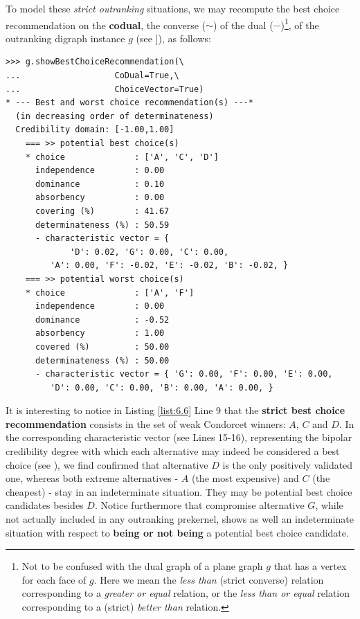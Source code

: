 To model these \emph{strict outranking} situations, we may recompute the best choice recommendation on the \textbf{codual}, the converse ($\sim$) of the dual ($-$)\footnote{Not to be confused with the dual graph of a plane graph $g$ that has a vertex for each face of $g$. Here we mean the \emph{less than} (strict converse) relation corresponding to a \emph{greater or equal} relation, or the \emph{less than or equal} relation corresponding to a (strict) \emph{better than} relation.}, of the outranking digraph instance $g$ (see \citep{BIS-2013}]), as follows:

\begin{lstlisting}[caption={Computing the strict best choice recommendation},label=list:6.6]
>>> g.showBestChoiceRecommendation(\
...                   CoDual=True,\
...                   ChoiceVector=True)   
* --- Best and worst choice recommendation(s) ---*
  (in decreasing order of determinateness)   
  Credibility domain: [-1.00,1.00]
    === >> potential best choice(s)
    * choice              : ['A', 'C', 'D']
      independence        : 0.00
      dominance           : 0.10
      absorbency          : 0.00
      covering (%)        : 41.67
      determinateness (%) : 50.59
      - characteristic vector = {
             'D': 0.02, 'G': 0.00, 'C': 0.00,
	     'A': 0.00, 'F': -0.02, 'E': -0.02, 'B': -0.02, }
    === >> potential worst choice(s) 
    * choice              : ['A', 'F']
      independence        : 0.00
      dominance           : -0.52
      absorbency          : 1.00
      covered (%)         : 50.00
      determinateness (%) : 50.00
      - characteristic vector = { 'G': 0.00, 'F': 0.00, 'E': 0.00,
	     'D': 0.00, 'C': 0.00, 'B': 0.00, 'A': 0.00, }
\end{lstlisting}				  

It is interesting to notice in Listing \ref{list:6.6} Line 9 that the \textbf{strict best choice recommendation} consists in the set of weak Condorcet winners: $A$, $C$ and $D$. In the corresponding characteristic vector (see Lines 15-16), representing the bipolar credibility degree with which each alternative may indeed be considered a best choice (see \citep{BIS-2006a,BIS-2006b}), we find confirmed that alternative $D$ is the only positively validated one, whereas both extreme alternatives - $A$ (the most expensive) and $C$ (the cheapest) - stay in an indeterminate situation. They may be potential best choice candidates besides $D$. Notice furthermore that compromise alternative $G$, while not actually included in any outranking prekernel, shows as well an indeterminate situation with respect to \textbf{being or not being} a potential best choice candidate. 

